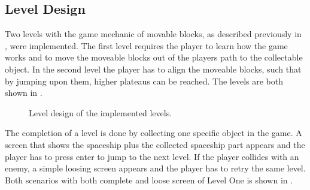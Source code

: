 \subsection{Level Design}\label{sec:game_design_level}
Two levels with the game mechanic of movable blocks, as described previously in , were implemented.
The first level requires the player to learn how the game works and to move the moveable blocks out of the players path to the collectable object.
In the second level the player has to align the moveable blocks, such that by jumping upon them, higher plateaus can be reached.
The levels are both shown in .
\begin{figure}[!ht]
  \centering
  \qquad
  \caption{Level design of the implemented levels.}
  \label{fig:game_design_level}
\end{figure}
\FloatBarrier
\noindent
The completion of a level is done by collecting one specific object in the game.
A screen that shows the spaceship plus the collected spaceship part appears and the player has to press enter to jump to the next level.
If the player collides with an enemy, a simple loosing screen appears and the player has to retry the same level.
Both scenarios with both complete and loose screen of Level One is shown in .
